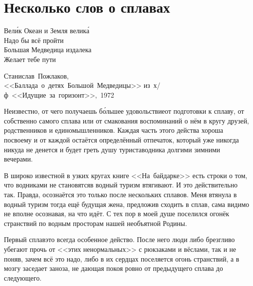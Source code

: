 \chapter{Несколько слов о сплавах} 

\vspace{-0.5cm}
\epigraph{%
	Вел\'{и}к Океан и Земля велик\'{а} \\
	Надо бы всё пройти \\
	Большая Медведица издалека \\
	Желает тебе пути}
	{
	\begin{flushright}
		\small{Станислав~Пожлаков,\\<<Баллада~о~детях~Большой~Медведицы>> из~х/ф~<<Идущие~за~горизонт>>,~1972}%
	\end{flushright}
	}

Неизвестно, от чего получаешь б\'{о}льшее удовольствие\mdash от подготовки к сплаву, от собственно самого сплава или от смакования воспоминаний о нём в кругу друзей, родственников и единомышленников. Каждая часть этого действа хороша по\sdash своему и от каждой остаётся определённый отпечаток, который уже никогда никуда не денется и будет греть душу туриста\sdash водника долгими зимними вечерами.

В широко известной в узких кругах книге <<На~байдарке>> \cite{Квадригин} есть строки о том, что водниками не становятся\mdash в водный туризм втягивают. И это действительно так. Правда, осознаётся это только после нескольких сплавов. Меня втянула в водный туризм тогда ещё будущая жена, предложив сходить в сплав, сама видимо не вполне осознавая, на что идёт. С тех пор в моей душе поселился огонёк странствий по водным просторам нашей необъятной Родины.

Первый сплав\mdash это всегда особенное действо. После него люди либо брезгливо убегают прочь от <<этих ненормальных>> с рюкзаками и вёслами, так и не поняв, зачем всё это надо, либо в их сердцах поселяется огонь странствий, а в мозгу заседает заноза, не дающая покоя ровно от предыдущего сплава до следующего. 

